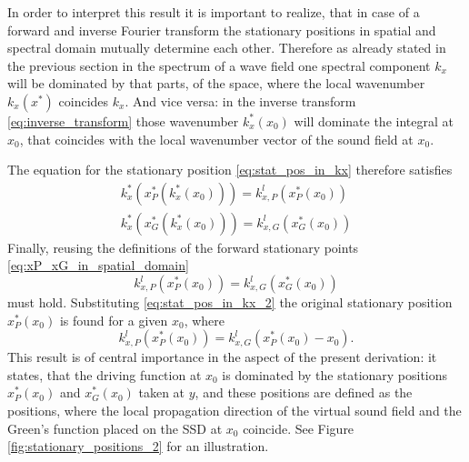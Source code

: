 \documentclass[12pt,a4paper]{article}
\begin{document}
In order to interpret this result it is important to realize, that in case of a forward and inverse Fourier transform the stationary positions in spatial and spectral domain mutually determine each other. Therefore as already stated in the previous section in the spectrum of a wave field one spectral component $k_x$ will be dominated by that parts, of the space, where the local wavenumber $k_x(x^*)$ coincides $k_x$. And vice versa: in the inverse transform \eqref{eq:inverse_transform} those wavenumber $k_x^*(x_0)$ will dominate the integral at $x_0$, that coincides with the local wavenumber vector of the sound field at $x_0$. 

The equation for the stationary position \eqref{eq:stat_pos_in_kx} therefore satisfies
\begin{eqnarray}
k_x^*(x^*_P(k_x^*(x_0))) = k^l_{x,P}(x^*_P(x_0)) \\
k_x^*(x^*_G(k_x^*(x_0))) = k^l_{x,G}(x^*_G(x_0))
\end{eqnarray}
Finally, reusing the definitions of the forward stationary points \eqref{eq:xP_xG_in_spatial_domain}
\begin{equation} 
k^l_{x,P}(x^*_P(x_0)) = k^l_{x,G}(x^*_G(x_0))
\end{equation}
must hold. Substituting \eqref{eq:stat_pos_in_kx_2} the original stationary position $x^*_P(x_0)$ is found for a given $x_0$, where 
\begin{equation}
k^l_{x,P}(x^*_P(x_0)) = k^l_{x,G}(x^*_P(x_0) - x_0).
\end{equation}
This result is of central importance in the aspect of the present derivation: it states, that the driving function at $x_0$ is dominated by the stationary positions $x^*_P(x_0)$ and $x^*_G(x_0)$ taken at $y$, and these positions are defined as the positions, where the local propagation direction of the virtual sound field and the Green's function placed on the SSD at $x_0$ coincide. See Figure \ref{fig:stationary_positions_2} for an illustration.
\end{document}
